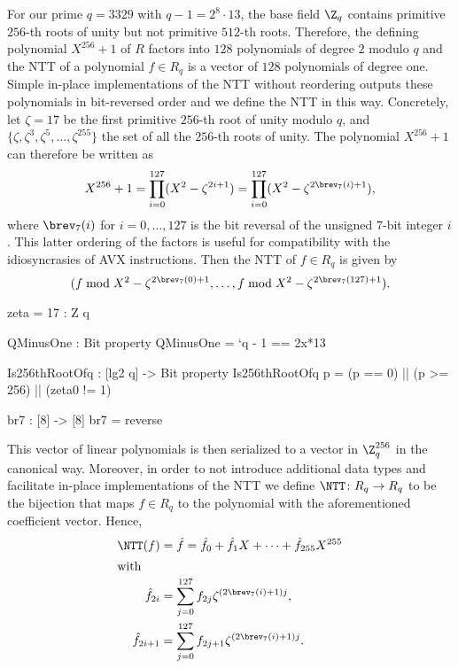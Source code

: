 For our prime $q = 3329$ with $q - 1 = 2^8\cdot 13$, the base field $\Z_q$ contains primitive $256$-th roots of unity but not primitive $512$-th roots. Therefore, the defining polynomial $X^{256} + 1$ of $R$ factors into $128$ polynomials of degree $2$ modulo $q$ and the NTT of a polynomial $f \in R_q$ is a vector of $128$ polynomials of degree one. Simple in-place implementations of the NTT without reordering outputs these polynomials in bit-reversed order and we define the NTT in this way. Concretely, let $\zeta = 17$ be the first primitive $256$-th root of unity modulo $q$, and $\{\zeta,\zeta^3,\zeta^5,\ldots,\zeta^{255}\}$ the set of all the $256$-th roots of unity.  The polynomial $X^{256}+1$ can therefore be written as 
$$X^{256}+1 = \prod\limits_{i=0}^{127} (X^2-\zeta^{2i+1}) = \prod\limits_{i=0}^{127} (X^2-\zeta^{2\brev_7(i)+1}),$$ where $\brev_7(i)$ for $i = 0, \dots, 127$ is the bit reversal of the unsigned $7$-bit integer $i$. This latter ordering of the factors is useful for compatibility with the idiosyncrasies of AVX instructions.  Then the NTT of $f \in R_q$ is given by 
\begin{equation}\label{eq:NTTdef}
(f \bmod X^2 - \zeta^{2\brev_7(0) + 1}, \dots, f \bmod X^2 - \zeta^{2\brev_7(127) + 1}).
\end{equation}

\begin{code}
  zeta = 17 : Z q

  QMinusOne : Bit
  property QMinusOne = `q - 1 == 2^^8*13

  Is256thRootOfq : [lg2 q] -> Bit
  property Is256thRootOfq p = (p == 0) || (p >= 256) || (zeta^^p != 1)

  br7 : [8] -> [8]
  br7 = reverse
\end{code}

 This vector of linear polynomials is then serialized to a vector in $\Z_q^{256}$ in the canonical way. Moreover, in order to not introduce additional data types and facilitate in-place implementations of the NTT we define $\NTT \colon R_q \to R_q$ to be the bijection that maps $f \in R_q$ to the polynomial with the aforementioned coefficient vector. Hence,
%
\begin{align}
  \NTT(f) &= \hat{f} = \hat{f}_0 + \hat{f}_1 X + \dots + \hat{f}_{255}X^{255} \nonumber \\
\intertext{with}
  \hat{f}_{2i} &= \sum_{j = 0}^{127} f_{2j}\zeta^{\left(2\brev_7(i) + 1\right)j},\label{eq:coeffeven} \\
  \hat{f}_{2i + 1} &= \sum_{j = 0}^{127} f_{2j + 1}\zeta^{\left(2\brev_7(i) + 1\right)j}.\label{eq:coeffodd}
\end{align} 

